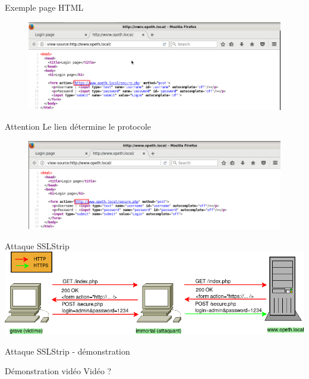 \begin{frame}{Exemple page HTML}
  \begin{figure}
    \includegraphics[width=0.8\linewidth]{../medias/sslstrip/screen2.png}
  \end{figure}
  \begin{alertblock}{Attention}
    Le lien détermine le protocole
  \end{alertblock}
  \begin{figure}
    \includegraphics[width=0.8\linewidth]{../medias/sslstrip/screen5.png}
  \end{figure}
\end{frame}



\begin{frame}{Attaque SSLStrip}
    \includegraphics[width=\linewidth]{../medias/sslstrip/attack.png}
\end{frame}


\begin{frame}{Attaque SSLStrip - démonstration}
  \begin{block}{Démonstration vidéo}
    Vidéo ?
  \end{block}
\end{frame}

